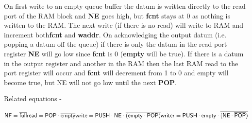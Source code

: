 
        On first write to an empty queue buffer the datum is
        written directly to the read port of the RAM block and
        {\bf NE} goes high, but {\bf fcnt} stays at 0 as nothing is
        written to the RAM. The next write (if there is no read) will
        write to RAM and increment both{\bf fcnt} and {\bf waddr}. On
        acknowledging the output datum (i.e. popping a datum off
        the queue) if there is only the datum in the read port register
        {\bf NE} will go low since {\bf fcnt} is 0 ({\bf empty}
        will be true). If there is a datum in the output register and
        another in the RAM then the last RAM read to the port register
        will occur and {\bf fcnt} will decrement from 1 to 0 and
        empty will become true, but NE will not go low until the next
        {\bf POP}.

        Related equations -

        $
        \mathsf{NF = \overline{full}} \\
        \mathsf{read = POP \cdot \overline{empty}} \\
        \mathsf{write = PUSH \cdot NE \cdot \overline{(empty \cdot POP)}} \\
        \mathsf{writer = PUSH \cdot empty \cdot \overline{(NE \cdot \overline{POP})}}
        $

